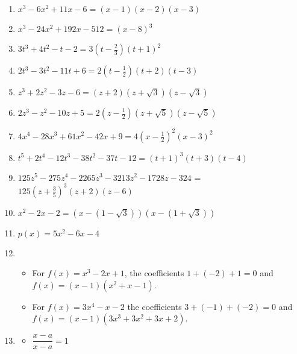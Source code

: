 \documentclass{ximera}
\begin{document}
\begin{enumerate}
\setcounter{enumi}{\value{HW}}

\item $x^{3} - 6x^{2} + 11x - 6 = (x - 1)(x - 2)(x - 3)$
\item $x^{3} - 24x^{2} + 192x - 512 = (x - 8)^{3}$
\item $3t^{3} + 4t^{2} - t - 2 = 3\left(t - \frac{2}{3}\right)(t + 1)^{2}$

\item $2t^3-3t^2-11t+6 = 2\left(t-\frac{1}{2}\right)(t+2)(t-3)$

\item $z^3+2z^2-3z-6 = (z+2)(z+\sqrt{3})(z-\sqrt{3})$
\item $2z^3-z^2-10z+5=2\left(z-\frac{1}{2}\right)(z+\sqrt{5})(z-\sqrt{5})$

\item $4x^{4} - 28x^{3} + 61x^{2} - 42x + 9 = 4\left(x - \frac{1}{2} \right)^{2}(x - 3)^{2}$

\item  $t^5+2t^4-12t^3-38t^2-37t-12 = (t+1)^3(t+3)(t-4)$

\item $125z^{5} - 275z^{4} - 2265z^{3} - 3213z^{2} - 1728z - 324$ = $125\left(z + \frac{3}{5} \right)^{3}(z + 2)(z - 6)$


\item $x^{2} - 2x - 2 = (x - (1 - \sqrt{3}))(x - (1 + \sqrt{3}))$

\item $p(x) = 5x^{2} - 6x - 4$

\addtocounter{enumi}{2}

\item  \begin{itemize}

\item For $f(x) = x^3 - 2x + 1$, the coefficients $1+(-2) + 1 = 0$ and $f(x) = (x-1)(x^2+x-1)$.

\item  For $f(x) = 3x^4-x-2$ the coefficients $3+(-1)+(-2) = 0$ and $f(x) = (x-1)(3x^3+3x^2+3x+2)$.

\end{itemize}

\item  \begin{multicols}{3}

\begin{itemize}

\item $\dfrac{x - a}{x-a} = 1$  


\end{itemize}
\end{multicols}
\end{enumerate}
\end{document}
